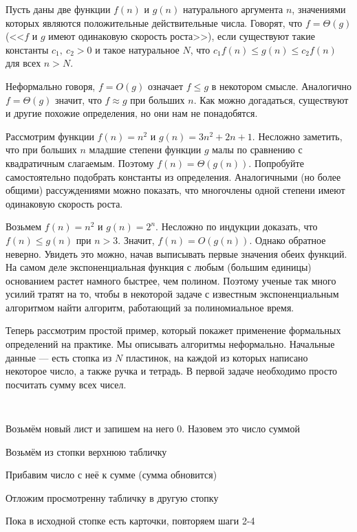 \begin{mydef}
	Пусть даны две функции $f(n)$ и $g(n)$ натурального аргумента $n$,
    значениями которых являются положительные действительные числа.
    Говорят, что $f = \Theta(g)$ (<<$f$ и $g$ имеют одинаковую скорость
    роста>>), если существуют такие константы $c_1,\ c_2 > 0$ и такое
    натуральное $N$, что $c_1 f(n) \leqslant g(n) \leqslant c_2
    f(n)$ для всех $n > N$.
\end{mydef}

Неформально говоря, $f = O(g)$ означает $f \leqslant g$ в некотором смысле.
Аналогично $f = \Theta(g)$ значит, что $f \approx g$ при больших $n$. Как 
можно догадаться, существуют и другие похожие определения, но они нам не 
понадобятся. 

\begin{example}
    Рассмотрим функции $f(n) = n^2$ и $g(n) = 3n^2 + 2n + 1$. Несложно
    заметить, что при больших $n$ младшие степени функции $g$ малы
    по сравнению с квадратичным слагаемым. Поэтому $f(n) = \Theta(g(n))$.
    Попробуйте самостоятельно подобрать константы из определения.
    Аналогичными (но более общими) рассуждениями можно показать, что
    многочлены одной степени имеют одинаковую скорость роста.
\end{example}

\begin{example}
    Возьмем $f(n) = n^2$ и $g(n) = 2^n$. Несложно по индукции доказать,
    что $f(n) \leqslant g(n)$ при $n > 3$. Значит, $f(n) = O(g(n))$.
    Однако обратное неверно. Увидеть это можно, начав выписывать
    первые значения обеих функций. На самом деле экспоненциальная
    функция с любым (большим единицы) основанием растет намного быстрее,
    чем полином. Поэтому ученые так много усилий тратят на то, чтобы
    в некоторой задаче с известным экспоненциальным алгоритмом
    найти алгоритм, работающий за полиномиальное время.
\end{example}

Теперь рассмотрим простой пример, который покажет применение формальных
определений на практике. Мы описывать алгоритмы неформально. Начальные 
данные --- есть стопка из $N$ пластинок, на каждой из которых написано 
некоторое число, а также ручка и тетрадь. В первой задаче необходимо 
просто посчитать сумму всех чисел.

\begin{enumerate}
    {\tt
    \item Возьмём новый лист и запишем на него 0. Назовем 
        это число суммой
    \item Возьмём из стопки верхнюю табличку
    \item Прибавим число с неё к сумме (сумма обновится)
    \item Отложим просмотренну табличку в другую стопку
    \item Пока в исходной стопке есть карточки, повторяем шаги 2-4
    }
\end{enumerate}

